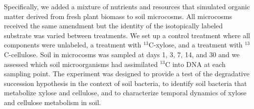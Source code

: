 Specifically, we added a mixture of nutrients and resources that simulated
organic matter derived from fresh plant biomass to soil microcosms. All
microcosms received the same amendment but the identity of the
isotopically labeled substrate was varied between treatments. We set up
a control treatment where all components were unlabeled, a treatment with
$^{13}$C-xylose, and a treatment with $^{13}$C-cellulose. Soil in microcosms
was sampled at days 1, 3, 7, 14, and 30 and we assessed which soil
microorganisms had assimilated $^{13}$C into DNA at each sampling point. The
experiment was designed to provide a test of the degradative succession
hypothesis in the context of soil bacteria, to identify soil bacteria that
metabolize xylose and cellulose, and to characterize temporal dynamics of
xylose and cellulose metabolism in soil. 
